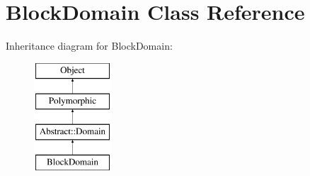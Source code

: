 \hypertarget{classBlockDomain}{}\section{Block\+Domain Class Reference}
\label{classBlockDomain}
Inheritance diagram for Block\+Domain\+:\begin{figure}[H]
\begin{center}
\leavevmode
\includegraphics[height=4.000000cm]{classBlockDomain}
\end{center}
\end{figure}
